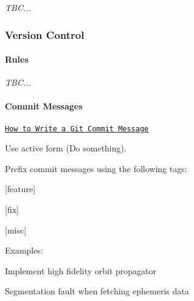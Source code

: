 {\itshape T\+BC...}

\subsubsection*{Version Control}

\paragraph*{Rules}

{\itshape T\+BC...}

\paragraph*{Commit Messages}

\href{https://chris.beams.io/posts/git-commit/}{\tt How to Write a Git Commit Message}

Use active form ({\ttfamily Do something}).

Prefix commit messages using the following tags\+:


\begin{DoxyItemize}
\item \mbox{[}feature\mbox{]}
\item \mbox{[}fix\mbox{]}
\item \mbox{[}misc\mbox{]}
\end{DoxyItemize}

Examples\+:


\begin{DoxyCode}
[feature] Implement high fidelity orbit propagator
\end{DoxyCode}



\begin{DoxyCode}
[fix] Segmentation fault when fetching ephemeris data
\end{DoxyCode}
 